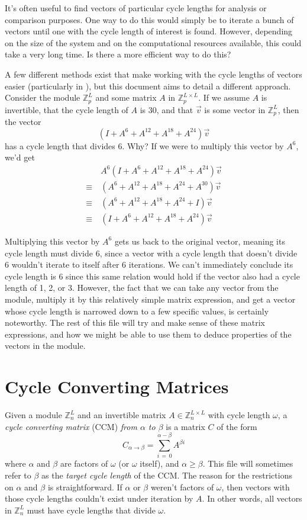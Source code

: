 \documentclass[a4paper, 12pt, reqno]{amsart}
\begin{document}
	It's often useful to find vectors of particular cycle lengths for analysis or comparison purposes. One way to do this would simply be to iterate a bunch of vectors 
	until one with the cycle length of interest is found. However, depending on the size of the system and on the computational resources available, this could take a very 
	long time. Is there a more efficient way to do this?
	
	A few different methods exist that make working with the cycle lengths of vectors easier (particularly in \citet{Patterson2008}), but this document aims to detail a
	different approach. Consider the module $\mathds{Z}_{p}^L$ and some matrix $A$ in $\mathds{Z}_{p}^{L \times L}$. If we assume $A$ is invertible, that the cycle length 
	of $A$ is 30, and that $\vec{v}$ is some vector in $\mathds{Z}_{p}^L$, then the vector
	\[
		(I + A^{6} + A^{12} + A^{18} + A^{24})\vec{v}
	\]
	has a cycle length that divides 6. Why? If we were to multiply this vector by $A^6$, we'd get
	\begin{align*}
		       & \ A^{6}(I + A^{6} + A^{12} + A^{18} + A^{24})\vec{v} \\
		\equiv & \ (A^{6} + A^{12} + A^{18} + A^{24} + A^{30})\vec{v} \\
		\equiv & \ (A^{6} + A^{12} + A^{18} + A^{24} + I)\vec{v}      \\
		\equiv & \ (I + A^{6} + A^{12} + A^{18} + A^{24})\vec{v}
	\end{align*}
	
	Multiplying this vector by $A^6$ gets us back to the original vector, meaning its cycle length must divide 6, since a vector with a cycle length that doesn't divide 6 
	wouldn't iterate to itself after 6 iterations.  We can't immediately conclude its cycle length is 6 since this same relation would hold if the vector also had a 
	cycle length of 1, 2, or 3. However, the fact that we can take any vector from the module, multiply it by this relatively simple matrix expression, and get a vector 
	whose cycle length is narrowed down to a few specific values, is certainly noteworthy. The rest of this file will try and make sense of these matrix expressions, and 
	how we might be able to use them to deduce properties of the vectors in the module.
	
	\section{Cycle Converting Matrices}
	Given a module $\mathds{Z}_{n}^{L}$ and an invertible matrix $A \in \mathds{Z}_{n}^{L \times L}$ with cycle length $\omega$, a \emph{cycle converting matrix} (CCM) 
	\emph{from $\alpha$ to $\beta$} is a matrix $C$ of the form
	\[
		C_{\alpha \rightarrow \beta} = \sum_{i \, = \, 0}^{\alpha - \beta} A^{\beta i}
	\]
	where $\alpha$ and $\beta$ are factors of $\omega$ (or $\omega$ itself), and $\alpha \geq \beta$. This file will sometimes refer to $\beta$ as the \emph{target cycle 
	length} of the CCM. The reason for the restrictions on $\alpha$ and $\beta$ is straightforward. If $\alpha$ or $\beta$ weren't factors of $\omega$, then vectors with 
	those cycle lengths couldn't exist under iteration by $A$. In other words, all vectors in $\mathds{Z}_{n}^L$ must have cycle lengths that divide $\omega$. 
	
\end{document}
